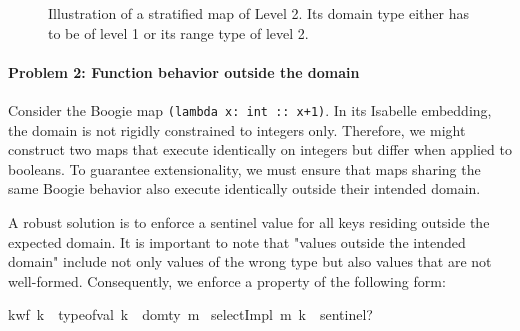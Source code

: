 \begin{figure}[t]
  \centering
  \caption{Illustration of a stratified map of Level 2.
  Its domain type either has to be of level 1
  or its range type of level 2.}
  \label{fig:stratified-map-hierarchy}
\end{figure}

\paragraph{Problem 2: Function behavior outside the domain}
Consider the Boogie map \lstinline[columns=fixed]{(lambda x: int :: x+1)}.
In its Isabelle embedding, the domain is not rigidly constrained to integers only.
Therefore, we might construct two maps that execute identically on integers but differ when applied to booleans.
To guarantee extensionality, we must ensure that maps sharing the same Boogie behavior also execute identically outside their intended domain. 

A robust solution is to enforce a sentinel value for all keys residing outside the expected domain.
It is important to note that "values outside the intended domain" include not only values of the wrong type but also values that are not well-formed.
Consequently, we enforce a property of the following form:

\begin{isabellebody}
{\isasymforall}k{\isachardot}{\kern0pt}{\isasymnot}wf\ k\ {\isasymor}\ type{\isacharunderscore}{\kern0pt}of{\isacharunderscore}{\kern0pt}val\ k\ {\isasymnoteq}\ dom{\isacharunderscore}{\kern0pt}ty\ m {\isasymlongrightarrow}\ {\isacharparenleft}{\kern0pt}selectImpl\ m\ k{\isacharparenright}{\kern0pt}\ {\isacharequal}{\kern0pt}\ sentinel?{\kern0pt}
\end{isabellebody}

